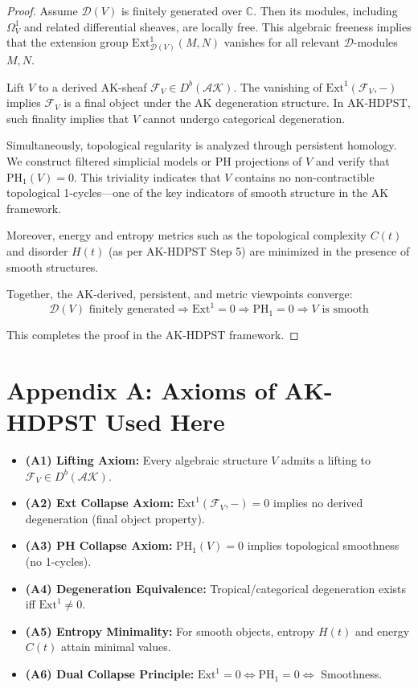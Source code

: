 \documentclass[11pt]{article}
\begin{document}
\begin{proof}
Assume $\mathcal{D}(V)$ is finitely generated over $\mathbb{C}$. Then its modules, including $\Omega^1_V$ and related differential sheaves, are locally free. This algebraic freeness implies that the extension group $\mathrm{Ext}^1_{\mathcal{D}(V)}(M, N)$ vanishes for all relevant $\mathcal{D}$-modules $M, N$.

Lift $V$ to a derived AK-sheaf $\mathcal{F}_V \in D^b(\mathcal{AK})$. The vanishing of $\mathrm{Ext}^1(\mathcal{F}_V, -)$ implies $\mathcal{F}_V$ is a final object under the AK degeneration structure. In AK-HDPST, such finality implies that $V$ cannot undergo categorical degeneration.

Simultaneously, topological regularity is analyzed through persistent homology. We construct filtered simplicial models or PH projections of $V$ and verify that $\mathrm{PH}_1(V) = 0$. This triviality indicates that $V$ contains no non-contractible topological 1-cycles—one of the key indicators of smooth structure in the AK framework.

Moreover, energy and entropy metrics such as the topological complexity $C(t)$ and disorder $H(t)$ (as per AK-HDPST Step 5) are minimized in the presence of smooth structures.

Together, the AK-derived, persistent, and metric viewpoints converge:
\[
\boxed{
\mathcal{D}(V)\text{ finitely generated} \Rightarrow \mathrm{Ext}^1 = 0 \Rightarrow \mathrm{PH}_1 = 0 \Rightarrow V \text{ is smooth}
}
\]

This completes the proof in the AK-HDPST framework.
\end{proof}

\section*{Appendix A: Axioms of AK-HDPST Used Here}
\begin{itemize}
  \item \textbf{(A1) Lifting Axiom:} Every algebraic structure $V$ admits a lifting to $\mathcal{F}_V \in D^b(\mathcal{AK})$.
  \item \textbf{(A2) Ext Collapse Axiom:} $\mathrm{Ext}^1(\mathcal{F}_V, -) = 0$ implies no derived degeneration (final object property).
  \item \textbf{(A3) PH Collapse Axiom:} $\mathrm{PH}_1(V) = 0$ implies topological smoothness (no 1-cycles).
  \item \textbf{(A4) Degeneration Equivalence:} Tropical/categorical degeneration exists iff $\mathrm{Ext}^1 \neq 0$.
  \item \textbf{(A5) Entropy Minimality:} For smooth objects, entropy $H(t)$ and energy $C(t)$ attain minimal values.
  \item \textbf{(A6) Dual Collapse Principle:} $\mathrm{Ext}^1 = 0 \iff \mathrm{PH}_1 = 0 \iff$ Smoothness.
\end{itemize}
\end{document}
